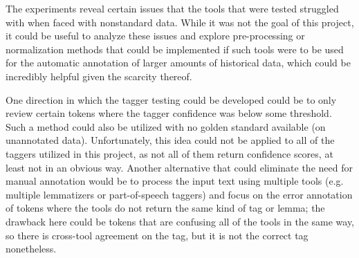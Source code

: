 The experiments reveal certain issues that the tools that were tested struggled with when faced with nonstandard data. While it was not the goal of this project, it could be useful to analyze these issues and explore pre-processing or normalization methods that could be implemented if such tools were to be used for the automatic annotation of larger amounts of historical data, which could be incredibly helpful given the scarcity thereof. 

One direction in which the tagger testing could be developed could be to only review certain tokens where the tagger confidence was below some threshold. Such a method could also be utilized with no golden standard available (on unannotated data). Unfortunately, this idea could not be applied to all of the taggers utilized in this project, as not all of them return confidence scores, at least not in an obvious way. Another alternative that could eliminate the need for manual annotation would be to process the input text using multiple tools (e.g. multiple lemmatizers or part-of-speech taggers) and focus on the error annotation of tokens where the tools do not return the same kind of tag or lemma; the drawback here could be tokens that are confusing all of the tools in the same way, so there is cross-tool agreement on the tag, but it is not the correct tag nonetheless.